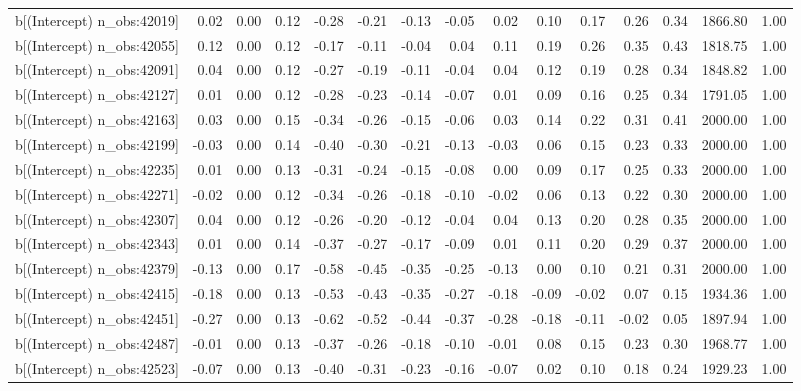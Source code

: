 \begin{table}[ht]
\begin{tabular}{rrrrrrrrrrrrrrr}
  b[(Intercept) n\_obs:42019] & 0.02 & 0.00 & 0.12 & -0.28 & -0.21 & -0.13 & -0.05 & 0.02 & 0.10 & 0.17 & 0.26 & 0.34 & 1866.80 & 1.00 \\ 
  b[(Intercept) n\_obs:42055] & 0.12 & 0.00 & 0.12 & -0.17 & -0.11 & -0.04 & 0.04 & 0.11 & 0.19 & 0.26 & 0.35 & 0.43 & 1818.75 & 1.00 \\ 
  b[(Intercept) n\_obs:42091] & 0.04 & 0.00 & 0.12 & -0.27 & -0.19 & -0.11 & -0.04 & 0.04 & 0.12 & 0.19 & 0.28 & 0.34 & 1848.82 & 1.00 \\ 
  b[(Intercept) n\_obs:42127] & 0.01 & 0.00 & 0.12 & -0.28 & -0.23 & -0.14 & -0.07 & 0.01 & 0.09 & 0.16 & 0.25 & 0.34 & 1791.05 & 1.00 \\ 
  b[(Intercept) n\_obs:42163] & 0.03 & 0.00 & 0.15 & -0.34 & -0.26 & -0.15 & -0.06 & 0.03 & 0.14 & 0.22 & 0.31 & 0.41 & 2000.00 & 1.00 \\ 
  b[(Intercept) n\_obs:42199] & -0.03 & 0.00 & 0.14 & -0.40 & -0.30 & -0.21 & -0.13 & -0.03 & 0.06 & 0.15 & 0.23 & 0.33 & 2000.00 & 1.00 \\ 
  b[(Intercept) n\_obs:42235] & 0.01 & 0.00 & 0.13 & -0.31 & -0.24 & -0.15 & -0.08 & 0.00 & 0.09 & 0.17 & 0.25 & 0.33 & 2000.00 & 1.00 \\ 
  b[(Intercept) n\_obs:42271] & -0.02 & 0.00 & 0.12 & -0.34 & -0.26 & -0.18 & -0.10 & -0.02 & 0.06 & 0.13 & 0.22 & 0.30 & 2000.00 & 1.00 \\ 
  b[(Intercept) n\_obs:42307] & 0.04 & 0.00 & 0.12 & -0.26 & -0.20 & -0.12 & -0.04 & 0.04 & 0.13 & 0.20 & 0.28 & 0.35 & 2000.00 & 1.00 \\ 
  b[(Intercept) n\_obs:42343] & 0.01 & 0.00 & 0.14 & -0.37 & -0.27 & -0.17 & -0.09 & 0.01 & 0.11 & 0.20 & 0.29 & 0.37 & 2000.00 & 1.00 \\ 
  b[(Intercept) n\_obs:42379] & -0.13 & 0.00 & 0.17 & -0.58 & -0.45 & -0.35 & -0.25 & -0.13 & 0.00 & 0.10 & 0.21 & 0.31 & 2000.00 & 1.00 \\ 
  b[(Intercept) n\_obs:42415] & -0.18 & 0.00 & 0.13 & -0.53 & -0.43 & -0.35 & -0.27 & -0.18 & -0.09 & -0.02 & 0.07 & 0.15 & 1934.36 & 1.00 \\ 
  b[(Intercept) n\_obs:42451] & -0.27 & 0.00 & 0.13 & -0.62 & -0.52 & -0.44 & -0.37 & -0.28 & -0.18 & -0.11 & -0.02 & 0.05 & 1897.94 & 1.00 \\ 
  b[(Intercept) n\_obs:42487] & -0.01 & 0.00 & 0.13 & -0.37 & -0.26 & -0.18 & -0.10 & -0.01 & 0.08 & 0.15 & 0.23 & 0.30 & 1968.77 & 1.00 \\ 
  b[(Intercept) n\_obs:42523] & -0.07 & 0.00 & 0.13 & -0.40 & -0.31 & -0.23 & -0.16 & -0.07 & 0.02 & 0.10 & 0.18 & 0.24 & 1929.23 & 1.00 \\ 

\end{tabular}
\end{table}
